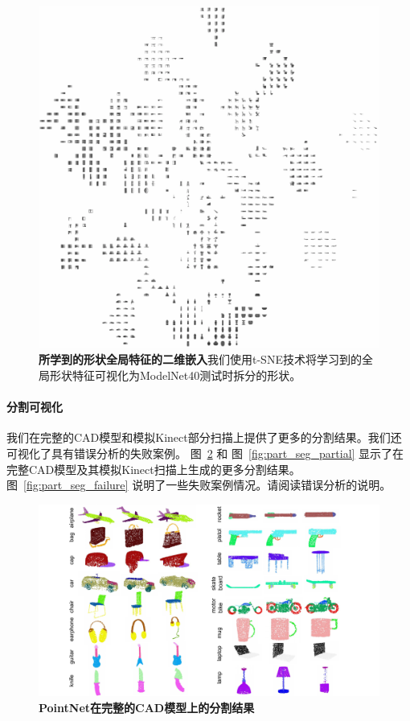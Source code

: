 \begin{figure}[t!]
\centering
\includegraphics[width=\linewidth]{fig/tsne.png}
\caption{\textbf{所学到的形状全局特征的二维嵌入}我们使用t-SNE技术将学习到的全局形状特征可视化为ModelNet40测试时拆分的形状。}
\label{fig:tsne}
\end{figure}


\paragraph{分割可视化} 我们在完整的CAD模型和模拟Kinect部分扫描上提供了更多的分割结果。我们还可视化了具有错误分析的失败案例。 图~\ref{fig:part_seg_complete} 和 图~\ref{fig:part_seg_partial} 显示了在完整CAD模型及其模拟Kinect扫描上生成的更多分割结果。 图~\ref{fig:part_seg_failure} 说明了一些失败案例情况。请阅读错误分析的说明。

\begin{figure}[t!]
\centering
\includegraphics[width=0.82\linewidth]{fig/part_seg_complete.pdf}
\caption{\textbf{PointNet在完整的CAD模型上的分割结果} }
\label{fig:part_seg_complete}
\end{figure}

